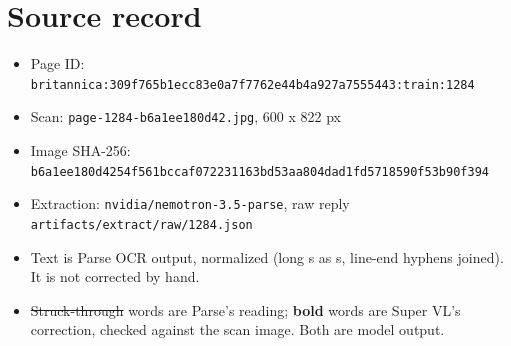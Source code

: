 \documentclass[10pt]{article}
\begin{document}
\section*{Source record}
\begin{itemize}
\item Page ID: \texttt{britannica:309f765b1ecc83e0a7f7762e44b4a927a7555443:train:1284}
\item Scan: \texttt{page-1284-b6a1ee180d42.jpg}, 600 x 822 px
\item Image SHA-256: \texttt{\small b6a1ee180d4254f561bccaf072231163bd53aa804dad1fd5718590f53b90f394}
\item Extraction: \texttt{nvidia/nemotron-3.5-parse}, raw reply \texttt{artifacts/extract/raw/1284.json}
\item Text is Parse OCR output, normalized (long s as s, line-end hyphens joined). It is not corrected by hand.
\item \sout{Struck-through} words are Parse's reading; \textbf{bold} words are Super VL's correction, checked against the scan image. Both are model output.
\end{itemize}
\end{document}
